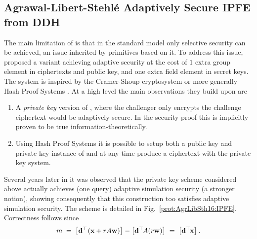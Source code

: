 
\subsection{Agrawal-Libert-Stehl\'{e} Adaptively Secure IPFE from DDH}

The main limitation of \cite{PKC:ABDP15} is that in the standard model only selective security can be achieved, an issue inherited by primitives based on it.
To address this issue, \cite{C:AgrLibSte16} proposed a variant achieving adaptive security at the cost of $1$ extra group element in ciphertexts and public key, and one extra field element in secret keys.
The system is inspired by the Cramer-Shoup cryptosystem \cite{C:CraSho98} or more generally Hash Proof Systems \cite{EC:CraSho02}.
At a high level the main observations they build upon are
\begin{enumerate}
	\item A \textit{private key} version of \cite{PKC:ABDP15}, where the challenger only encrypts the challenge ciphertext would be adaptively secure.
	In the security proof this is implicitly proven to be true information-theoretically.
	
	\item Using Hash Proof Systems it is possible to setup both a public key and private key instance of \cite{PKC:ABDP15} and at any time produce a ciphertext with the private-key system.
\end{enumerate}

Several years later in \cite{PKC:ALMT20} it was observed that the private key scheme considered above actually achieves (one query) adaptive simulation security (a stronger notion), showing consequently that this construction too satisfies adaptive simulation security.
The scheme is detailed in Fig.~\ref{prot:AgrLibSth16:IPFE}.
Correctness follows since
\[
	m
		\; = \;
 	\left[{\mathbf{d}^\top\hspace{-.1em} \left(\mathbf{x} + rA \mathbf{w} \right)}\right]_{}
 		-
 	\left[{\mathbf{d}^\top\hspace{-.1em} A (r\mathbf{w})}\right]_{}
 		\; = \;
 	\left[{\mathbf{d}^\top\hspace{-.1em}\mathbf{x}}\right]_{}.
\]

